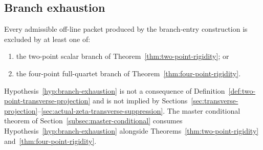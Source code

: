 
\subsection{Branch exhaustion}
\label{subsec:branch-exhaustion}

\begin{hypothesis}
\label{hyp:branch-exhaustion}
Every admissible off-line packet produced by the branch-entry
construction is excluded by at least one of:
\begin{enumerate}[label=\textup{(\roman*)},leftmargin=*]
\item the two-point scalar branch of
      Theorem~\ref{thm:two-point-rigidity}; or
\item the four-point full-quartet branch of
      Theorem~\ref{thm:four-point-rigidity}.
\end{enumerate}
\end{hypothesis}

\begin{remark}
\label{rem:branch-exhaustion-status}
Hypothesis~\ref{hyp:branch-exhaustion} is not a consequence of
Definition~\ref{def:two-point-transverse-projection} and is not implied by
Sections~\ref{sec:transverse-projection}--\ref{sec:actual-zeta-transverse-suppression}.
The master conditional theorem of
Section~\ref{subsec:master-conditional} consumes
Hypothesis~\ref{hyp:branch-exhaustion} alongside
Theorems~\ref{thm:two-point-rigidity}
and~\ref{thm:four-point-rigidity}.
\end{remark}

